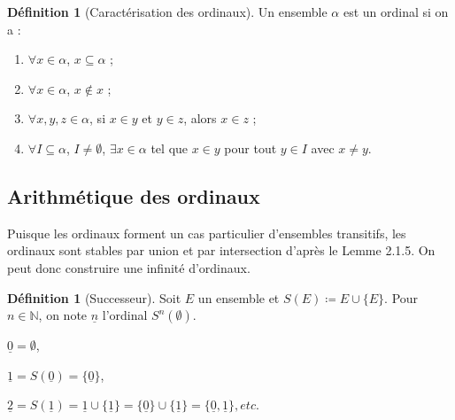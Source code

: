 \documentclass[french]{article}
\theoremstyle{definition}
\newtheorem{definition}[subsubsection]{Définition}
\theoremstyle{plain}
\theoremstyle{plain}
\theoremstyle{plain}
\theoremstyle{plain}
\theoremstyle{plain}
\begin{document}
\begin{definition}[Caractérisation des ordinaux]
	Un ensemble \( \alpha \) est un ordinal si on a :
	\begin{enumerate}[label = (\roman*)]
		\item \( \forall x \in \alpha \), \( x \subseteq \alpha \) ;
		\item \( \forall x \in \alpha \), \( x \not\in x \) ;
		\item \( \forall x, y, z \in \alpha \), si \( x \in y \) et \( y \in z \), alors \( x \in z \) ;
		\item \( \forall I \subseteq \alpha \), \( I \neq \emptyset \), \( \exists x \in \alpha \) tel que \( x \in y \) pour tout \( y \in I \) avec \( x \neq y \).
	\end{enumerate}
\end{definition}

\subsection{Arithmétique des ordinaux}

\par Puisque les ordinaux forment un cas particulier d'ensembles transitifs, les ordinaux sont stables par union et par intersection d'après le Lemme 2.1.5. On peut donc construire une infinité d'ordinaux.

\begin{definition}[Successeur]
	Soit \( E \) un ensemble et \( S(E) \coloneqq E \cup \{E\} \). Pour \( n \in \mathbb{N} \), on note \( \underline{n} \) l'ordinal \( S^{n}(\emptyset) \).
\end{definition}

\begin{description}
	\item \( \underline{0} = \emptyset \),
	\item \( \underline{1} = S(\underline{0}) = \{\underline{0}\} \),
	\item \( \underline{2} = S(\underline{1}) = \underline{1} \cup  \{\underline{1}\} = \{\underline{0}\} \cup \{\underline{1}\} = \{\underline{0}, \underline{1}\},  etc.\)
\end{description}
\end{document}
